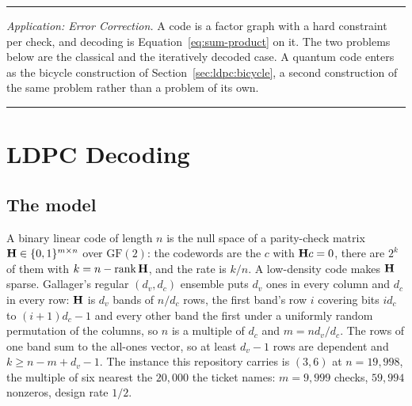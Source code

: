 \documentclass[11pt,a4paper]{article}
\begin{document}
\begin{center}\rule{0.45\linewidth}{0.4pt}\end{center}
\noindent\textit{Application: Error Correction.} A code is a factor graph with a hard
constraint per check, and decoding is Equation~\ref{eq:sum-product} on it. The
two problems below are the classical and the iteratively decoded case. A
quantum code enters as the bicycle construction of
Section~\ref{sec:ldpc:bicycle}, a second construction of the same problem
rather than a problem of its own.
\begin{center}\rule{0.45\linewidth}{0.4pt}\end{center}

\section{LDPC Decoding}
\label{sec:ldpc}

\subsection{The model}
\label{sec:ldpc:model}
A binary linear code of length $n$ is the null space of a parity-check
matrix $\mathbf{H} \in \{0,1\}^{m \times n}$ over $\mathrm{GF}(2)$: the
codewords are the $c$ with $\mathbf{H} c = 0$, there are $2^k$ of them with
$k = n - \operatorname{rank} \mathbf{H}$, and the rate is $k/n$. A
low-density code makes $\mathbf{H}$ sparse. Gallager's regular
$(d_v, d_c)$ ensemble \citep{gallager1962} puts $d_v$ ones in every column
and $d_c$ in every row: $\mathbf{H}$ is $d_v$ bands of $n / d_c$ rows, the
first band's row $i$ covering bits $i d_c$ to $(i+1) d_c - 1$ and every
other band the first under a uniformly random permutation of the columns,
so $n$ is a multiple of $d_c$ and $m = n d_v / d_c$. The rows of one band
sum to the all-ones vector, so at least $d_v - 1$ rows are dependent and
$k \ge n - m + d_v - 1$. The instance this repository carries is
$(3, 6)$ at $n = 19{,}998$, the multiple of six nearest the $20{,}000$ the
ticket names: $m = 9{,}999$ checks, $59{,}994$ nonzeros, design rate $1/2$.
\end{document}
